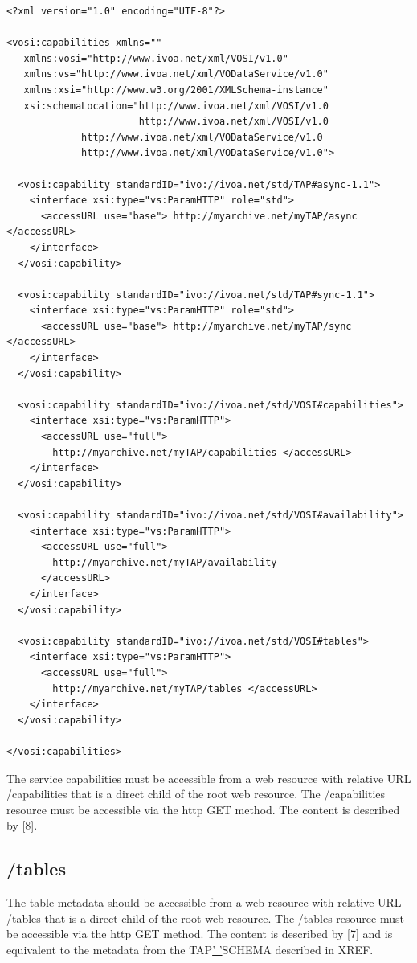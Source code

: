 \documentclass[11pt,a4paper]{ivoa}
\begin{document}
\begin{verbatim}
<?xml version="1.0" encoding="UTF-8"?>

<vosi:capabilities xmlns=""
   xmlns:vosi="http://www.ivoa.net/xml/VOSI/v1.0"
   xmlns:vs="http://www.ivoa.net/xml/VODataService/v1.0"
   xmlns:xsi="http://www.w3.org/2001/XMLSchema-instance"
   xsi:schemaLocation="http://www.ivoa.net/xml/VOSI/v1.0
                       http://www.ivoa.net/xml/VOSI/v1.0
             http://www.ivoa.net/xml/VODataService/v1.0
             http://www.ivoa.net/xml/VODataService/v1.0">

  <vosi:capability standardID="ivo://ivoa.net/std/TAP#async-1.1">
    <interface xsi:type="vs:ParamHTTP" role="std">
      <accessURL use="base"> http://myarchive.net/myTAP/async </accessURL>
    </interface>
  </vosi:capability>

  <vosi:capability standardID="ivo://ivoa.net/std/TAP#sync-1.1">
    <interface xsi:type="vs:ParamHTTP" role="std">
      <accessURL use="base"> http://myarchive.net/myTAP/sync </accessURL>
    </interface>
  </vosi:capability>

  <vosi:capability standardID="ivo://ivoa.net/std/VOSI#capabilities">
    <interface xsi:type="vs:ParamHTTP">
      <accessURL use="full">
        http://myarchive.net/myTAP/capabilities </accessURL>
    </interface>
  </vosi:capability>

  <vosi:capability standardID="ivo://ivoa.net/std/VOSI#availability">
    <interface xsi:type="vs:ParamHTTP">
      <accessURL use="full">
        http://myarchive.net/myTAP/availability
      </accessURL>
    </interface>
  </vosi:capability>

  <vosi:capability standardID="ivo://ivoa.net/std/VOSI#tables">
    <interface xsi:type="vs:ParamHTTP">
      <accessURL use="full">
        http://myarchive.net/myTAP/tables </accessURL>
    </interface>
  </vosi:capability>

</vosi:capabilities>
\end{verbatim}

The service capabilities must be accessible from a web resource with relative 
URL /capabilities that is a direct child of the root web resource. The 
/capabilities resource must be accessible via the http GET method. The content 
is described by [8].

\subsection{/tables}
The table metadata should be accessible from a web resource with relative URL 
/tables that is a direct child of the root web resource. The /tables resource 
must be accessible via the http GET method. The content is described by [7] and 
is equivalent to the metadata from the TAP\underline{' '}SCHEMA described in 
XREF.
\end{document}
